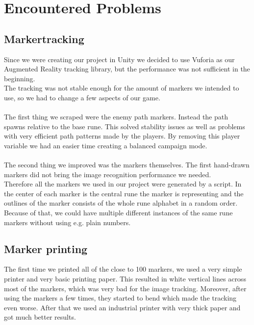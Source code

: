 \section{Encountered Problems}

\subsection{Markertracking}

Since we were creating our project in Unity we decided to use Vuforia as our Augmented Reality tracking library, but the performance was not sufficient in the beginning.\\
The tracking was not stable enough for the amount of markers we intended to use, so we had to change a few aspects of our game.\\\\
The first thing we scraped were the enemy path markers. Instead the path spawns relative to the base rune. This solved stability issues as well as problems with very efficient path patterns made by the players.
By removing this player variable we had an easier time creating a balanced campaign mode.\\\\
The second thing we improved was the markers themselves. The first hand-drawn markers did not bring the image recognition performance we needed.\\
Therefore all the markers we used in our project were generated by a script. In the center of each marker is the central rune the marker is representing and the outlines of the marker consists of the whole rune alphabet in a random order.
Because of that, we could have multiple different instances of the same rune markers without using e.g. plain numbers.\\

\subsection{Marker printing}

The first time we printed all of the close to 100 markers, we used a very simple printer and very basic printing paper.
This resulted in white vertical lines across most of the markers, which was very bad for the image tracking. 
Moreover, after using the markers a few times, they started to bend which made the tracking even worse.
After that we used an industrial printer with very thick paper and got much better results.

